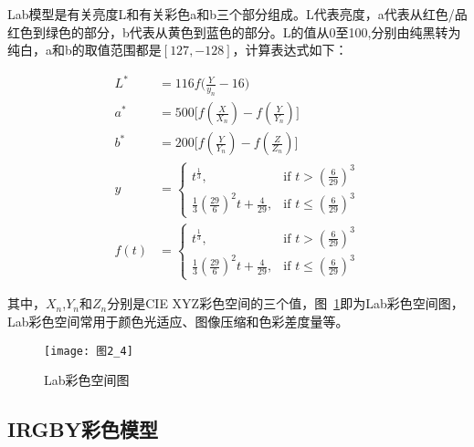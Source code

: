Lab模型是有关亮度L和有关彩色a和b三个部分组成。L代表亮度，a代表从红色/品红色到绿色的部分，b代表从黄色到蓝色的部分。L的值从0至100,分别由纯黑转为纯白，a和b的取值范围都是$[127,-128]$，计算表达式如下：
\begin{linenomath}
\begin{align}
L^{*} &= 116f\big(\frac{Y}{y_{n}}-16\big)\label{式2_1}\\
a^{*} &= 500\big[f(\frac{X}{X_{n}})-f(\frac{Y}{Y_{n}})\big]\label{式2_2}\\
b^{*} &= 200\big[f(\frac{Y}{Y_{n}})-f(\frac{Z}{Z_{n}})\big]\label{式2_3}\\
y &= \left\{ \begin{array}{ll}
t^{\frac{1}{3}}, & \textrm{if $t>(\frac{6}{29})^{3}$}\\
\frac{1}{3}(\frac{29}{6})^{2}t+\frac{4}{29}, & \textrm{if $t\leq (\frac{6}{29})^{3}$}
\end{array} \right.\label{式2_4}\\
f(t) &= \left\{ \begin{array}{ll}
t^{\frac{1}{3}}, & \textrm{if $t>(\frac{6}{29})^{3}$}\\
\frac{1}{3}(\frac{29}{6})^{2}t+\frac{4}{29}, & \textrm{if $t\leq (\frac{6}{29})^{3}$}
\end{array} \right.\label{式2_5}
\end{align}
\end{linenomath}
其中，$X_{n}$,$Y_{n}$和$Z_{n}$分别是CIE XYZ彩色空间的三个值，图~\ref{图2_4}即为Lab彩色空间图，Lab彩色空间常用于颜色光适应、图像压缩和色彩差度量等。
\begin{figure}[h]
  \centering
  \texttt{[image: 图2\_4]}
  \caption{Lab彩色空间图}
  \label{图2_4}    
\end{figure}

\subsection{IRGBY彩色模型}
\label{2_1_3}

